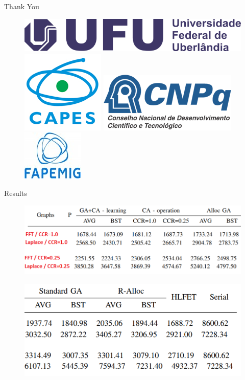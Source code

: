 \documentclass{beamer}
\begin{document}
\begin{frame}[b]{}
\centering
\huge Thank You
\linebreak
\linebreak
\linebreak
\begin{figure}
\centering
\includegraphics[width=.25\textwidth,valign=c]{ufu} \hspace{.1\textwidth}
\includegraphics[width=.10\textwidth,valign=c]{capes} \hspace{.1\textwidth}
\includegraphics[width=.18\textwidth,valign=c]{cnpq} \hspace{.1\textwidth}
\includegraphics[width=.10\textwidth,valign=c]{fapemig} 
\end{figure}
\end{frame}

\begin{frame}{Results}
\begin{figure}
\includegraphics[width=\textwidth]{table1}
\end{figure}
\begin{figure}
\includegraphics[width=.75\textwidth,right]{table2}
\end{figure}
\end{frame}
\end{document}
